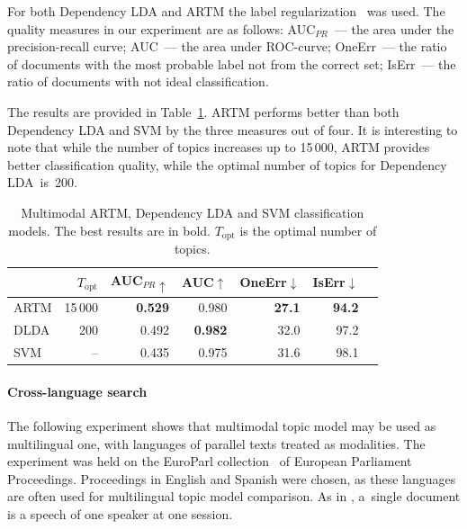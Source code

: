 \documentclass{acm_proc_article-sp}
\begin{document}
For both Dependency LDA and ARTM the label regularization~\cite{rubin12statistical} was used.
The quality measures in our experiment are as follows:
AUC$_{PR}$~--- the area under the precision-recall curve;
AUC~--- the area under ROC-curve;
OneErr~--- the ratio of documents with the most probable label not from the correct set;
IsErr~--- the ratio of documents with not ideal classification.

The results are provided in Table~\ref{tab:classification}.
ARTM performs better than both Dependency LDA and SVM by the three measures out of four.
It is interesting to note that
while the number of topics increases up to 15\,000,
ARTM provides better classification quality,
while the optimal number of topics for Dependency LDA~is~200.

\begin{table}[t]
    \caption{Multimodal ARTM, Dependency LDA and SVM classification models.
        The best results are in bold. $T_{\mathrm{opt}}$ is the optimal number of topics.}
    \label{tab:classification}
    \medskip\centering\tabcolsep=5pt
    \begin{tabular}[t]{l|rrrrrr}
    \hline
     & $T_{\mathrm{opt}}$ & AUC$_{PR}\uparrow$ & AUC$\uparrow$ & OneErr$\downarrow$ & IsErr$\downarrow$ \\
    \hline
        ARTM  & 15\,000 & {\bf 0.529} & 0.980       & {\bf 27.1}  & {\bf 94.2}  \\
        DLDA  & 200   & 0.492       & {\bf 0.982} & 32.0        & 97.2        \\
        SVM   & --    & 0.435       & 0.975       & 31.6        & 98.1        \\
    \hline
    \end{tabular}
\end{table}

\paragraph{Cross-language search}
The following experiment shows that multimodal topic model may be used as multilingual one,
with languages of parallel texts treated as modalities.
The experiment was held on the \mbox{EuroParl} collection~\cite{koehn05parallel} of European Parliament Proceedings.
Proceedings in English and Spanish were chosen, as these languages are often used for multilingual topic model comparison.
As in \cite{mimno09polylingual,platt10translingual,mimno12sparse},
a~single document is a speech of one speaker at one session.
\end{document}
